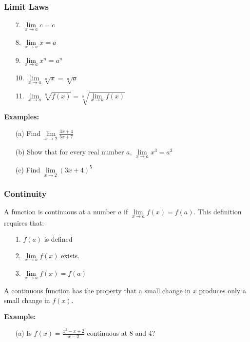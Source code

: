 \documentclass{beamer}
\begin{document}
\begin{frame}
\frametitle{\textbf{Limit Laws}}

\begin{itemize}
	\item[7.]$\lim\limits_{x \to a}c=c$
	\item[8.]$\lim\limits_{x \to a}x=a$
	\item[9.]$\lim\limits_{x \to a}x^n = a^n$
	\item[10.]$\lim\limits_{x \to a} \sqrt[n]{x} = \sqrt[n]{a}$
	\item[11.]$\lim\limits_{x \to a} \sqrt[n]{f(x)} = \sqrt[n]{\lim\limits_{x \to a} f(x)}$
\end{itemize}

\vspace{12pt}

\textbf{Examples:}
\begin{itemize}
	\item[(a)] Find $\lim\limits_{x \to 2}\frac{3x+4}{5x+7}$
	\item[(b)] Show that for every real number $a$, $\lim\limits_{x \to a}x^3=a^3$
	\item[(c)] Find $\lim\limits_{x \to 2}(3x+4)^5$
\end{itemize}
\end{frame}

\begin{frame}
\frametitle{\textbf{Continuity}}
A function is continuous at a number $a$ if $\lim\limits_{x \to a}f(x)=f(a)$. This definition requires that:
\begin{itemize}
	\item[1.] $f(a)$ is defined
	\item[2.]$\lim\limits_{x \to a}f(x)$ exists.
	\item[3.]$\lim\limits_{x \to a}f(x)=f(a)$
\end{itemize}
A continuous function has the property that a small change in $x$ produces only a small change in $f(x)$.

\vspace{12pt}

\textbf{Example:}
\begin{itemize}
	\item[(a)] Is $f(x) = \frac{x^2-x+2}{x-2}$ continuous at $8$ and $4$?
\end{itemize}
\end{frame}
\end{document}

